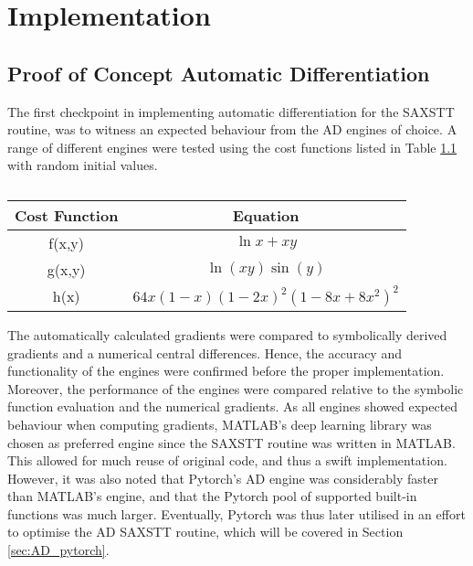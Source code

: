 
\chapter{Implementation}

\section{Proof of Concept Automatic Differentiation}

The first checkpoint in implementing automatic differentiation for the SAXSTT routine, was to witness an expected behaviour from the AD engines of choice.
A range of different engines were tested using the cost functions listed in Table \ref{} with random initial values.

\begin{table}[h]
    \centering
    \caption{}
    \label{tab:cost_functions}
    \begin{tabular}{ c c }
        \hline
        \textbf{Cost Function} & \textbf{Equation}                \\
        \hline
        f(x,y)                 & $\ln{x} + xy$                    \\
        g(x,y)                 & $\ln(xy)\sin(y)$                 \\
        h(x)                   & $64x(1-x) (1-2x)^2(1-8x+8x^2)^2$ \\
    \end{tabular}
\end{table}



The automatically calculated gradients were compared to symbolically derived gradients and a numerical central differences.
Hence, the accuracy and functionality of the engines were confirmed before the proper implementation.
Moreover, the performance of the engines were compared relative to the symbolic function evaluation and the numerical gradients.
As all engines showed expected behaviour when computing gradients,
MATLAB's deep learning library was chosen as preferred engine since the SAXSTT routine was written in MATLAB.
This allowed for much reuse of original code, and thus a swift implementation.
However, it was also noted that Pytorch's AD engine was considerably faster than MATLAB's engine, and that the Pytorch pool of supported built-in functions was much larger.
Eventually, Pytorch was thus later utilised in an effort to optimise the AD SAXSTT routine, which will be covered in Section \ref{sec:AD_pytorch}.


